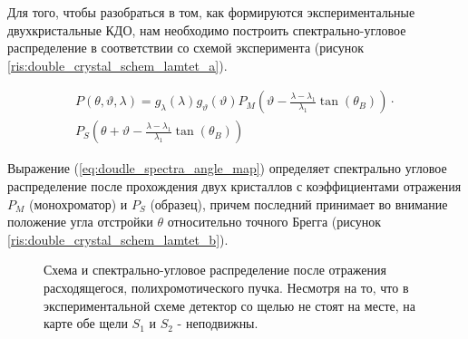 
Для того, чтобы разобраться в том, как формируются экспериментальные
двухкристальные КДО, нам необходимо построить спектрально-угловое распределение
в соответствии со схемой эксперимента (рисунок \ref{ris:double_crystal_schem_lamtet_a}).

\begin{eqnarray} \label{eq:doudle_spectra_angle_map}
  P(\theta,\vartheta,\lambda) = g_{\lambda}(\lambda)g_{\vartheta}(\vartheta) P_M \left(\vartheta - \frac{\lambda - \lambda_1}{\lambda_1}\tan(\theta_B) \right) \cdot \nonumber \\
   P_S \left(\theta + \vartheta - \frac{\lambda - \lambda_1}{\lambda_1}\tan(\theta_B)\right)
 \end{eqnarray}

Выражение (\ref{eq:doudle_spectra_angle_map}) определяет спектрально угловое распределение после прохождения двух кристаллов с
коэффициентами отражения  $P_M$ (монохроматор) и $P_S$ (образец), причем последний принимает во внимание положение угла отстройки $\theta$ относительно
точного Брегга (рисунок \ref{ris:double_crystal_schem_lamtet_b}).

\begin{figure}[H]
  \centering
  \hfill

  \caption{Схема и спектрально-угловое распределение после отражения расходящегося, полихромотического пучка. Несмотря на то, что в
  экспериментальной схеме детектор со щелью не стоят на месте, на карте обе щели $S_1$ и $S_2$ - неподвижны. }
  \label{ris:double_crystal_schem_lamtet}
\end{figure}

